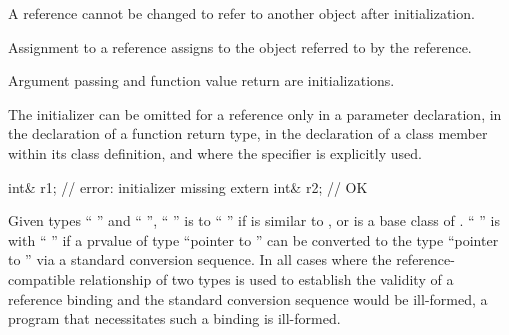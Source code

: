 \pnum
A reference cannot be changed to refer to another object after initialization.
%
\begin{note}
Assignment to a reference assigns to the object referred to by the reference.
\end{note}
%
Argument passing
%
and function value return are initializations.

\pnum
The initializer can be omitted for a reference only in a parameter declaration,
in the declaration of a function return type, in the declaration of
a class member within its class definition, and where the
specifier is explicitly used.
%
\begin{example}
\begin{codeblock}
int& r1;                        // error: initializer missing
extern int& r2;                 // OK
\end{codeblock}
\end{example}

\pnum
Given types `` '' and `` '',
`` '' is  to
`` '' if
 is similar to , or
 is a base class of .
`` '' is 
with `` '' if
a prvalue of type ``pointer to  '' can be converted to
the type ``pointer to  ''
via a standard conversion sequence.
In all cases where the reference-compatible relationship
of two types is used to establish the validity of a reference binding and
the standard conversion sequence would be ill-formed,
a program that necessitates such a binding is ill-formed.

